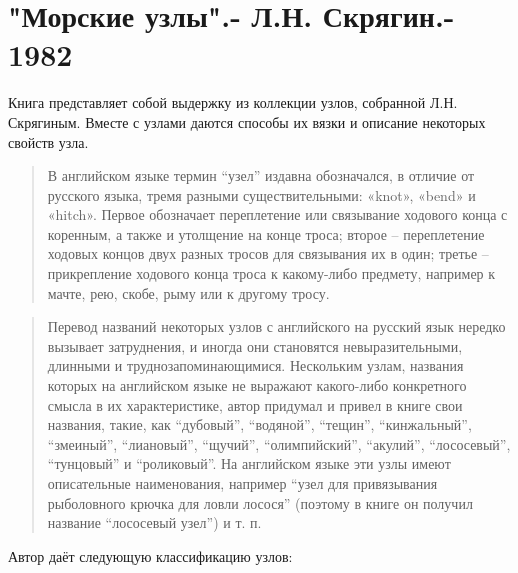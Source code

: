 \section{"Морские узлы".- Л.Н. Скрягин.- 1982}

Книга представляет собой выдержку из коллекции узлов, собранной Л.Н. Скрягиным. Вместе с узлами даются способы их вязки и описание некоторых свойств узла.

\begin{quote} В английском языке термин “узел” издавна обозначался, в отличие от русского языка, тремя разными существительными: «knot», «bend» и «hitch». Первое обозначает переплетение или связывание ходового конца с коренным, а также и утолщение на конце троса; второе – переплетение ходовых концов двух разных тросов для связывания их в один; третье – прикрепление ходового конца троса к какому-либо предмету, например к мачте, рею, скобе, рыму или к другому тросу.
\end{quote}

\begin{quote}
Перевод названий некоторых узлов с английского на русский язык нередко вызывает затруднения, и иногда они становятся невыразительными, длинными и труднозапоминающимися. Нескольким узлам, названия которых на английском языке не выражают какого-либо конкретного смысла в их характеристике, автор придумал и привел в книге свои названия, такие, как “дубовый”, “водяной”, “тещин”, “кинжальный”, “змеиный”, “лиановый”, “щучий”, “олимпийский”, “акулий”, “лососевый”, “тунцовый” и “роликовый”. На английском языке эти узлы имеют описательные наименования, например “узел для привязывания рыболовного крючка для ловли лосося” (поэтому в книге он получил название “лососевый узел”) и т. п.
\end{quote}

Автор даёт следующую классификацию узлов:

